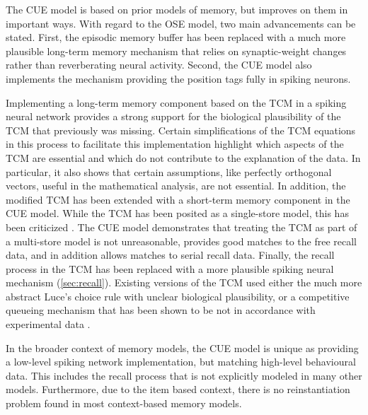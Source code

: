 The CUE model is based on prior models of memory, but improves on them in important ways.
With regard to the OSE model, two main advancements can be stated.
First, the episodic memory buffer has been replaced with a much more plausible long-term memory mechanism that relies on synaptic-weight changes rather than reverberating neural activity.
Second, the CUE model also implements the mechanism providing the position tags fully in spiking neurons.

Implementing a long-term memory component based on the TCM in a spiking neural network provides a strong support for the biological plausibility of the TCM that previously was missing.
Certain simplifications of the TCM equations in this process to facilitate this implementation highlight which aspects of the TCM are essential and which do not contribute to the explanation of the data.
In particular, it also shows that certain assumptions, like perfectly orthogonal vectors, useful in the mathematical analysis, are not essential.
In addition, the modified TCM has been extended with a short-term memory component in the CUE model.
While the TCM has been posited as a single-store model, this has been criticized \parencite{Davelaar2008}.
The CUE model demonstrates that treating the TCM as part of a multi-store model is not unreasonable, provides good matches to the free recall data, and in addition allows matches to serial recall data.
Finally, the recall process in the TCM has been replaced with a more plausible spiking neural mechanism (\cref{sec:recall}).
Existing versions of the TCM used either the much more abstract Luce's choice rule with unclear biological plausibility, or a competitive queueing mechanism that has been shown to be not in accordance with experimental data \parencite{davelaar2007}.

In the broader context of memory models, the CUE model is unique as providing a low-level spiking network implementation, but matching high-level behavioural data.
This includes the recall process that is not explicitly modeled in many other models.
Furthermore, due to the item based context, there is no reinstantiation problem found in most context-based memory models.


